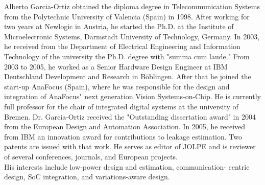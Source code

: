 \begin{IEEEbiography}{Alberto Garcia-Ortiz}
    obtained the diploma degree in
    Telecommunication Systems from the Polytechnic University of
    Valencia (Spain) in 1998. After working for two years at Newlogic
    in Austria, he started the Ph.D. at the Institute of
    Microelectronic Systems, Darmstadt University of Technology,
    Germany. In 2003, he received from the Department of Electrical
    Engineering and Information Technology of the university the
    Ph.D. degree with "summa cum laude." From 2003 to 2005, he worked
    as a Senior Hardware Design Engineer at IBM Deutschland
    Development and Research in B{\"o}blingen.  After that he joined the
    start-up AnaFocus (Spain), where he was responsible for the design
    and integration of AnaFocus" next generation Vision
    Systems-on-Chip. He is currently full professor for the chair of
    integrated digital systems at the university of Bremen.
    Dr. Garcia-Ortiz received the "Outstanding dissertation award" in
    2004 from the European Design and Automation Association. In 2005,
    he received from IBM an innovation award for contributions to
    leakage estimation. Two patents are issued with that work. He
    serves as editor of JOLPE and is reviewer of several conferences,
    journals, and European projects. \\
    His interests include low-power
    design and estimation, communication- centric design, SoC
    integration, and variations-aware design. 
\end{IEEEbiography}
